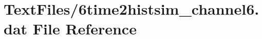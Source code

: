 \hypertarget{6time2histsim__channel6_8dat}{}\section{Text\+Files/6time2histsim\+\_\+channel6.dat File Reference}
\label{6time2histsim__channel6_8dat}
